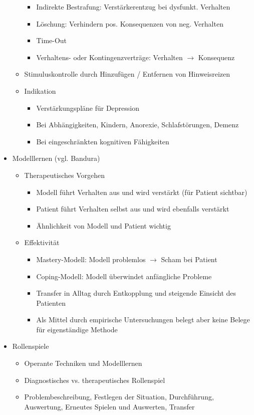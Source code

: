 \documentclass[11pt, paper=a4, twocolumn]{scrartcl}
\begin{document}
\begin{itemize}
\begin{itemize}
\begin{itemize}
							\item Indirekte Bestrafung: Verstärkerentzug bei dysfunkt. Verhalten
							\item Löschung: Verhindern pos. Konsequenzen von neg. Verhalten
							\item Time-Out
							\item Verhaltens- oder Kontingenzverträge: Verhalten $\rightarrow$ Konsequenz
						\end{itemize}
					\item Stimuluskontrolle durch Hinzufügen / Entfernen von Hinweisreizen
					\item Indikation
						\begin{itemize}
							\item Verstärkungspläne für Depression
							\item Bei Abhängigkeiten, Kindern, Anorexie, Schlafstörungen, Demenz
							\item Bei eingeschränkten kognitiven Fähigkeiten
						\end{itemize}
				\end{itemize}
			\item Modelllernen (vgl. Bandura)
				\begin{itemize}
					\item Therapeutisches Vorgehen
						\begin{itemize}
							\item Modell führt Verhalten aus und wird verstärkt (für Patient sichtbar)
							\item Patient führt Verhalten selbst aus und wird ebenfalls verstärkt
							\item Ähnlichkeit von Modell und Patient wichtig
						\end{itemize}
					\item Effektivität
						\begin{itemize}
							\item Mastery-Modell: Modell problemlos $\rightarrow$ Scham bei Patient
							\item Coping-Modell: Modell überwindet anfängliche Probleme
							\item Transfer in Alltag durch Entkopplung und steigende Einsicht des Patienten
							\item Als Mittel durch empirische Untersuchungen belegt aber keine Belege für eigenständige 
								Methode
						\end{itemize}
				\end{itemize}
			\item Rollenspiele
				\begin{itemize}
					\item Operante Techniken und Modelllernen
					\item Diagnostisches vs. therapeutisches Rollenspiel
					\item Problembeschreibung, Festlegen der Situation, Durchführung, Auswertung, Erneutes Spielen und Auswerten, 
						Transfer
				\end{itemize}
		\end{itemize}
\end{document}
